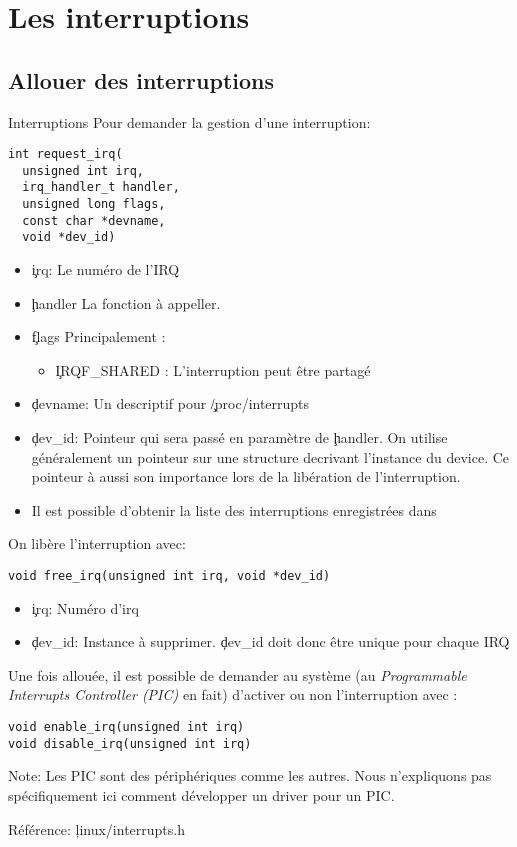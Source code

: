 

\section{Les interruptions}

\subsection{Allouer des interruptions}

\begin{frame}[fragile=singleslide]{Interruptions}
  Pour demander la gestion d'une interruption:
  \begin{lstlisting}  
int request_irq(
  unsigned int irq, 
  irq_handler_t handler, 
  unsigned long flags, 
  const char *devname, 
  void *dev_id)
  \end{lstlisting} 
  \begin{itemize} 
  \item \c{irq}: Le numéro de l'IRQ
  \item \c{handler} La fonction à appeller.
  \item \c{flags} Principalement : 
    \begin{itemize} 
    \item \c{IRQF_SHARED} : L'interruption peut être partagé
    \end{itemize} 
  \item \c{devname}: Un descriptif pour \c{/proc/interrupts}
  \item  \c{dev_id}:   Pointeur  qui   sera  passé  en   paramètre  de
    \c{handler}. On utilise généralement un pointeur sur une structure
    decrivant l'instance du device. Ce pointeur à aussi son importance
    lors de la libération de l'interruption.
  \item  Il   est  possible  d'obtenir  la   liste  des  interruptions
    enregistrées dans 
  \end{itemize} 
  On libère l'interruption avec:
  \begin{lstlisting} 
void free_irq(unsigned int irq, void *dev_id)
  \end{lstlisting} 
  \begin{itemize} 
  \item \c{irq}: Numéro d'irq
  \item \c{dev_id}:  Instance à  supprimer. \c{dev_id} doit  donc être
    unique pour chaque IRQ
  \end{itemize}

  Une  fois  allouée, il  est  possible  de  demander au  système  (au
  \emph{Programmable Interrupts  Controller (PIC)} en  fait) d'activer
  ou non l'interruption avec :
  \begin{lstlisting}
void enable_irq(unsigned int irq)
void disable_irq(unsigned int irq)
  \end{lstlisting} 

  Note:  Les  PIC  sont  des  périphériques  comme  les  autres.  Nous
  n'expliquons  pas spécifiquement  ici comment  développer  un driver
  pour un PIC.

  Référence:  \c{linux/interrupts.h}
\end{frame}

